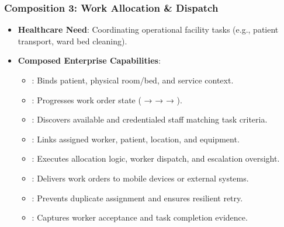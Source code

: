 \subsubsection*{Composition 3: Work Allocation \& Dispatch}
\label{rad:enterprise:304}

\begin{itemize}

\item
\textbf{Healthcare Need}: Coordinating operational facility tasks (e.g., patient transport, ward bed cleaning).



\item
\textbf{Composed Enterprise Capabilities}:


\begin{itemize}

\item
\texttt{}: Binds patient, physical room/\allowbreak{}bed, and service context.



\item
\texttt{}: Progresses work order state (\texttt{} → \texttt{} → \texttt{} → \texttt{}).



\item
\texttt{}: Discovers available and credentialed staff matching task criteria.



\item
\texttt{}: Links assigned worker, patient, location, and equipment.



\item
\texttt{}: Executes allocation logic, worker dispatch, and escalation oversight.



\item
\texttt{}: Delivers work orders to mobile devices or external systems.



\item
\texttt{}: Prevents duplicate assignment and ensures resilient retry.



\item
\texttt{}: Captures worker acceptance and task completion evidence.



\end{itemize}


\end{itemize}
\label{rad:enterprise:315}

